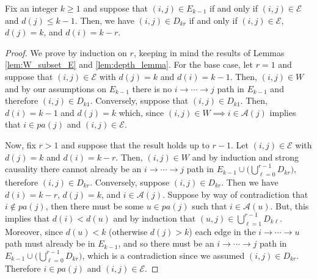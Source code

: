 \documentclass[12pt]{article}
\def\gcge{\mathcal{E}}  %
\newcommand{\pa}[1]{pa(#1)}  %
\newcommand{\anc}[1]{\mathcal{A}(#1)}  %
\newcommand{\gcgpath}[2]{#1 \rightarrow \cdots \rightarrow #2}  %
\begin{document}
\begin{lemma}
  \label{lem:inner_loop_lemma}
  Fix an integer $k \ge 1$ and suppose that $(i, j) \in E_{k - 1}$ if
  and only if $(i, j) \in \gcge$ and $d(j) \le k - 1$.  Then, we have
  $(i, j) \in D_{kr}$ if and only if $(i, j) \in \gcge $, $d(j) = k$,
  and $d(i) = k - r$.
\end{lemma}
\begin{proof}
  We prove by induction on $r$, keeping in mind the results of Lemmas
  \ref{lem:W_subset_E} and \ref{lem:depth_lemma}.  For the base case,
  let $r = 1$ and suppose that $(i, j) \in \gcge$ with $d(j) = k$ and
  $d(i) = k - 1$.  Then, $(i, j) \in W$ and by our assumptions on
  $E_{k - 1}$ there is no $\gcgpath{i}{j}$ path in $E_{k - 1}$
  and therefore $(i, j) \in D_{k1}$.  Conversely, suppose that
  $(i, j) \in D_{k1}$.  Then, $d(i) = k - 1$ and $d(j) = k$ which, since
  $(i, j) \in W \implies i \in \anc{j}$ implies that
  $i \in \pa{j}$ and $(i, j) \in \gcge$.

  Now, fix $r > 1$ and suppose that the result holds up to $r - 1$.
  Let $(i, j) \in \gcge$ with $d(j) = k$ and $d(i) = k - r$.  Then,
  $(i, j) \in W$ and by induction and strong causality there cannot
  already be an $\gcgpath{i}{j}$ path in
  $E_{k - 1} \cup \big(\bigcup_{\ell = 0}^{r - 1} D_{kr}\big)$,
  therefore $(i, j) \in D_{kr}$.  Conversely, suppose
  $(i, j) \in D_{kr}$.  Then we have $d(i) = k - r$, $d(j) = k$, and
  $i \in \anc{j}$.  Suppose by way of contradiction that
  $i \not\in \pa{j}$, then there must be some $u \in \pa{j}$ such that
  $i \in \anc{u}$.  But, this implies that $d(i) < d(u)$ and by
  induction that $(u, j) \in \bigcup_{\ell = 1}^{r - 1}D_{k\ell}$.
  Moreover, since $d(u) < k$ (otherwise $d(j) > k$) each edge in
  the $\gcgpath{i}{u}$ path must already be in $E_{k - 1}$, and so
  there must be an $\gcgpath{i}{j}$ path in
  $E_{k - 1}\cup\big(\bigcup_{\ell = 0}^{r - 1}D_{kr}\big)$, which is
  a contradiction since we assumed $(i, j) \in D_{kr}$.  Therefore
  $i \in \pa{j}$ and $(i, j) \in \gcge$.
\end{proof}
\end{document}
